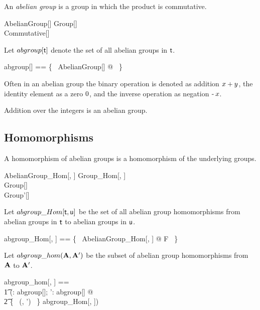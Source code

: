 \documentclass{amsart}
\begin{document}
An \textit{abelian group} is a group in which the product is commutative.

\begin{schema}{AbelianGroup}[\genT]
	Group[\genT] \\
	Commutative[\genT]
\end{schema}

Let $abgroup[\mathsf{t}]$ denote the set of all abelian groups in $\mathsf{t}$.
\begin{zed}
	abgroup[\genT] == \{~ AbelianGroup[\genT] @ \strucA ~\}
\end{zed}

Often in an abelian group the binary operation is denoted as addition $x \mathbin{+} y$,
the identity element as a zero $0$, and the inverse operation as negation $\operatorname{-} x$.

\begin{example}
Addition over the integers is an abelian group.


\end{example}

\subsection{Homomorphisms}

A homomorphism of abelian groups is a homomorphism of the underlying groups.

\begin{schema}{AbelianGroup\_Hom}[\genT, \genU]
	Group\_Hom[\genT, \genU] \\
	Group[\genT] \\
	Group'[\genU]
\end{schema}

Let $abgroup\_Hom[\mathsf{t}, \mathsf{u}]$ be the set of all abelian group homomorphisms
from abelian groups in $\mathsf{t}$ to abelian groups in $\mathsf{u}$.

\begin{zed}
	abgroup\_Hom[\genT, \genU] == \{~ AbelianGroup\_Hom[\genT, \genU] @ F ~\}
\end{zed}

Let $abgroup\_hom(\mathbf{A}, \mathbf{A}')$ be the subset of abelian group homomorphisms
from $\mathbf{A}$ to $\mathbf{A}'$.

\begin{zed}
	abgroup\_hom[\genT, \genU] == \\
	\t1	(\lambda \strucA: abgroup[\genT]; \strucA': abgroup[\genU] @ \\
	\t2		\{~ (\strucA, \strucA') ~\} \dres abgroup\_Hom[\genT, \genU])
\end{zed}

\printbibliography
\end{document}
